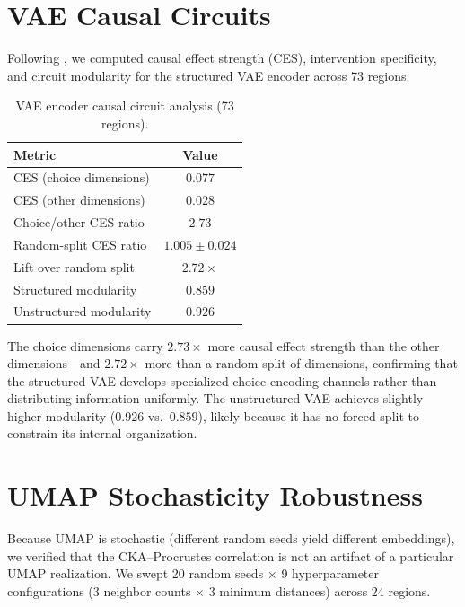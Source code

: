 \documentclass{article}
\begin{document}
\section{VAE Causal Circuits}
\label{app:circuits}

Following \citet{martinez2025vae_circuits}, we computed causal effect strength (CES), intervention specificity, and circuit modularity for the structured VAE encoder across 73 regions.

\begin{table}[h]
\centering
\small
\caption{VAE encoder causal circuit analysis (73 regions).}
\label{tab:circuits}
\begin{tabular}{@{}lc@{}}
\toprule
\textbf{Metric} & \textbf{Value} \\
\midrule
CES (choice dimensions) & $0.077$ \\
CES (other dimensions) & $0.028$ \\
Choice/other CES ratio & $\mathbf{2.73}$ \\
Random-split CES ratio & $1.005 \pm 0.024$ \\
Lift over random split & $2.72\times$ \\
Structured modularity & $0.859$ \\
Unstructured modularity & $0.926$ \\
\bottomrule
\end{tabular}
\end{table}

The choice dimensions carry $2.73\times$ more causal effect strength than the other dimensions---and $2.72\times$ more than a random split of dimensions, confirming that the structured VAE develops specialized choice-encoding channels rather than distributing information uniformly. The unstructured VAE achieves slightly higher modularity ($0.926$ vs.\ $0.859$), likely because it has no forced split to constrain its internal organization.

\section{UMAP Stochasticity Robustness}
\label{app:umap}

Because UMAP is stochastic (different random seeds yield different embeddings), we verified that the CKA--Procrustes correlation is not an artifact of a particular UMAP realization. We swept 20 random seeds $\times$ 9 hyperparameter configurations (3 neighbor counts $\times$ 3 minimum distances) across 24 regions.
\end{document}
